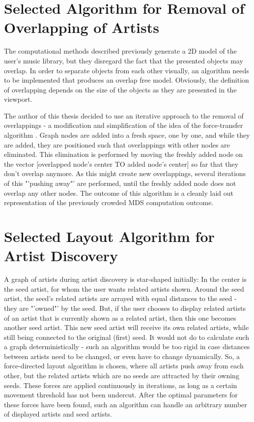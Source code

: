 \section{Selected Algorithm for Removal of Overlapping of Artists}

The computational methods described previously generate a 2D model of the user's music library, but they disregard the fact that the presented objects may overlap. In order to separate objects from each other visually, an algorithm needs to be implemented that produces an overlap free model. Obviously, the definition of overlapping depends on the size of the objects as they are presented in the viewport.

The author of this thesis decided to use an iterative approach to the removal of overlappings - a modification and simplification of the idea of the force-transfer algorithm \cite{Huang03force-transfer:a}. Graph nodes are added into a fresh space, one by one, and while they are added, they are positioned such that overlappings with other nodes are eliminated. This elimination is performed by moving the freshly added node on the vector [overlapped node's center TO added node's center] so far that they don't overlap anymore. As this might create new overlappings, several iterations of this "'pushing away"' are performed, until the freshly added node does not overlap any other nodes. The outcome of this algorithm is a cleanly laid out representation of the previously crowded MDS computation outcome.

\section{Selected Layout Algorithm for Artist Discovery}

A graph of artists during artist discovery is star-shaped initially: In the center is the seed artist, for whom the user wants related artists shown. Around the seed artist, the seed's related artists are arrayed with equal distances to the seed - they are "'owned"' by the seed. But, if the user chooses to display related artists of an artist that is currently shown as a related artist, then this one becomes another seed artist. This new seed artist will receive its own related artists, while still being connected to the original (first) seed. It would not do to calculate such a graph deterministically - such an algorithm would be too rigid in case distances between artists need to be changed, or even have to change dynamically. So, a force-directed layout algorithm is chosen, where all artists push away from each other, but the related artists which are no seeds are attracted by their owning seeds. These forces are applied continuously in iterations, as long as a certain movement threshold has not been undercut. After the optimal parameters for these forces have been found, such an algorithm can handle an arbitrary number of displayed artists and seed artists.

